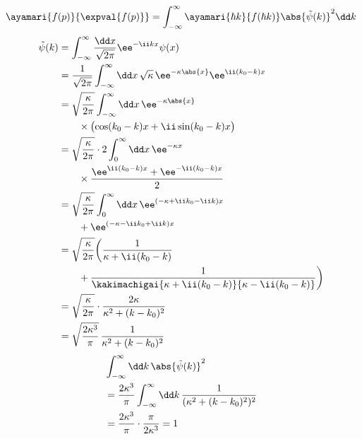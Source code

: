 \[ \ayamari{f(p)}{\expval{f(p)}}=\int_{-\infty}^{\infty}\ayamari{\hbar k}{f(\hbar k)}\abs{\tilde{\psi}(k)}^{2}\dd k \]
\begin{align*}
\tilde{\psi}(k)&=\int_{-\infty}^{\infty}\frac{\dd x}{\sqrt{2\pi}}\ee^{-\ii kx}\psi(x)\\
&=\frac{1}{\sqrt{2\pi}}\int_{-\infty}^{\infty}\dd x\,\sqrt{\kappa}\,\ee^{-\kappa\abs{x}}\ee^{\ii(k_{0}-k)x}\\
&=\sqrt{\frac{\kappa}{2\pi}}\int_{-\infty}^{\infty}\dd x\,\ee^{-\kappa\abs{x}}\\
&\qquad\times\bigl(\cos(k_{0}-k)x+\ii\sin(k_{0}-k)x\bigr)\\
&=\sqrt{\frac{\kappa}{2\pi}}\cdot2\int_{0}^{\infty}\dd x\,\ee^{-\kappa x}\\
&\qquad\times\frac{\ee^{\ii(k_{0}-k)x}+\ee^{-\ii(k_{0}-k)x}}{2}\\
&=\sqrt{\frac{\kappa}{2\pi}}\int_{0}^{\infty}\dd x\,\ee^{(-\kappa+\ii k_{0}-\ii k)x}\\
&\qquad+\ee^{(-\kappa-\ii k_{0}+\ii k)x}\\
&=\sqrt{\frac{\kappa}{2\pi}}\biggl(\frac{1}{\kappa+\ii(k_{0}-k)}\\
&\qquad+\frac{1}{\kakimachigai{\kappa+\ii(k_{0}-k)}{\kappa-\ii(k_{0}-k)}}\biggr)\\
&=\sqrt{\frac{\kappa}{2\pi}}\cdot\frac{2\kappa}{\kappa^{2}+(k-k_{0})^{2}}\\
&=\sqrt{\frac{2\kappa^{3}}{\pi}}\,\frac{1}{\kappa^{2}+(k-k_{0})^{2}}
\end{align*}
\begin{align*}
&\int_{-\infty}^{\infty}\dd k\,\abs{\tilde{\psi}(k)}^{2}\\
&=\frac{2\kappa^{3}}{\pi}\int_{-\infty}^{\infty}\dd k\,\frac{1}{(\kappa^{2}+(k-k_{0})^{2})^{2}}\\
&=\frac{2\kappa^{3}}{\pi}\cdot\frac{\pi}{2\kappa^{3}}=1
\end{align*}
